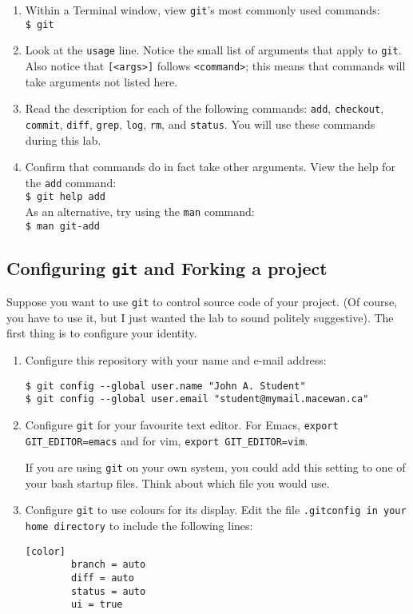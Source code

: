 \documentclass[letterpaper]{article}
\begin{document}
\begin{enumerate}
\item Within a Terminal window, view {\tt git}'s most commonly used commands:\\
  \verb+$ git+
\item Look at the {\tt usage} line.
  Notice the small list of arguments that apply to {\tt git}.
  Also notice that {\tt [<args>]} follows {\tt <command>}; this means that commands will take arguments not listed here.
\item Read the description for each of the following commands: {\tt add}, {\tt checkout}, {\tt commit}, {\tt diff}, {\tt grep}, {\tt log}, {\tt rm}, and {\tt status}.
  You will use these commands during this lab.
\item Confirm that commands do in fact take other arguments.
  View the help for the {\tt add} command:\\
  \verb+$ git help add+\\
  As an alternative, try using the {\tt man} command:\\
  \verb+$ man git-add+\\
\end{enumerate}

\subsection*{Configuring {\tt git} and Forking a project }

Suppose you want to use {\tt git} to control source code of your project.  (Of
course, you have to use it, but I just wanted the lab to sound politely
suggestive).  The first thing is to configure your identity.

\begin{enumerate}
\item Configure this repository with your name and e-mail address:
  \begin{verbatim}
$ git config --global user.name "John A. Student"
$ git config --global user.email "student@mymail.macewan.ca"
\end{verbatim}

\item Configure {\tt git} for your favourite text editor.
  For Emacs, {\tt export GIT\_EDITOR=emacs} and for vim, {\tt export GIT\_EDITOR=vim}.

  If you are using {\tt git} on your own system, you could add this setting to one of your bash startup files.
  Think about which file you would use.
\item Configure {\tt git} to use colours for its display.
  Edit the file \verb+.gitconfig in your home directory+ to include the following lines:
  \begin{verbatim}
[color]
        branch = auto
        diff = auto
        status = auto
        ui = true
\end{verbatim}
\end{enumerate}
\end{document}
